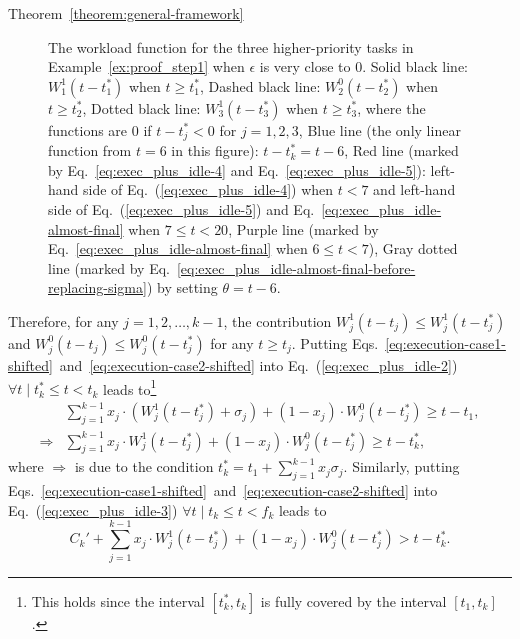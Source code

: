 \begin{appProof}{Theorem~\ref{theorem:general-framework}}
\begin{figure}[t]
  \caption{\small The workload function for the three higher-priority tasks in Example~\ref{ex:proof_step1} when $\epsilon$ is very close to $0$. Solid black line: $W_1^1(t-t_1^*)$ when $t \geq t_1^*$, Dashed black line: $W_2^0(t-t_2^*)$ when $t \geq t_2^*$, Dotted black line: $W_3^1(t-t_3^*)$ when $t \geq t_3^*$, where the functions are $0$ if $t-t_j^* < 0$ for $j=1,2,3$, Blue line (the only linear function from $t=6$ in this figure): $t-t_k^*=t-6$, Red line (marked by Eq.~\eqref{eq:exec_plus_idle-4} and Eq.~\eqref{eq:exec_plus_idle-5}): left-hand side of Eq.~(\ref{eq:exec_plus_idle-4}) when $t < 7$ and left-hand side of Eq.~(\ref{eq:exec_plus_idle-5}) and Eq.~\eqref{eq:exec_plus_idle-almost-final} when $ 7 \leq t < 20$, Purple line (marked by Eq.~\eqref{eq:exec_plus_idle-almost-final} when $6 \leq t < 7$), Gray dotted line (marked by Eq.~\eqref{eq:exec_plus_idle-almost-final-before-replacing-sigma}) by setting $\theta=t-6$.}
  \label{fig:example-proof-final}
\end{figure}


Therefore, for any $j=1,2,\ldots,k-1$, the contribution $W_j^1(t-t_j)
\leq W_j^1(t-t_j^*)$ and $W_j^0(t-t_j) \leq W_j^0(t-t_j^*)$ for any $t
\geq t_j$. Putting Eqs.~\eqref{eq:execution-case1-shifted}~and~\eqref{eq:execution-case2-shifted} into 
Eq.~(\ref{eq:exec_plus_idle-2}) $\forall t \mid t_k^* \leq t < t_k$ leads to\footnote{This holds since the interval $[t_k^*, t_k]$ is fully covered by the interval $[t_1, t_k]$.}
{\small \begin{align}
&\sum_{j=1}^{k-1} x_j\cdot (W_j^1(t-t_j^*)+\sigma_j) + (1-x_j)\cdot W_j^0(t-t_j^*) \geq t-t_1,\nonumber\\
\Rightarrow& \sum_{j=1}^{k-1} x_j\cdot W_j^1(t-t_j^*) + (1-x_j)\cdot W_j^0(t-t_j^*) \geq t-t_k^*,
\label{eq:exec_plus_idle-4}
\end{align}}where $\Rightarrow$ is due to the condition
$t_k^* = t_1 + \sum_{j=1}^{k-1}x_j\sigma_j$.
Similarly, putting Eqs.~\eqref{eq:execution-case1-shifted}~and~\eqref{eq:execution-case2-shifted} into 
Eq.~(\ref{eq:exec_plus_idle-3}) $\forall t \mid t_k \leq t < f_k$ leads to 
\begin{equation}
\label{eq:exec_plus_idle-5}
C_k'+\sum_{j=1}^{k-1} x_j\cdot W_j^1(t-t_j^*) + (1-x_j)\cdot W_j^0(t-t_j^*) > t-t_k^*.
\end{equation}


\end{appProof}
